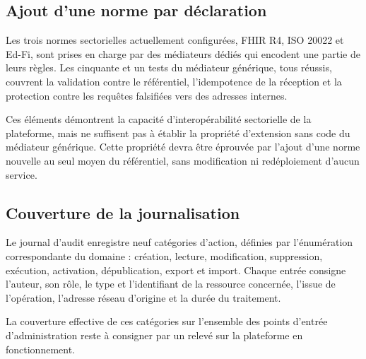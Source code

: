 
\subsection{Ajout d'une norme par déclaration}

Les trois normes sectorielles actuellement configurées, FHIR R4, ISO 20022 et
Ed-Fi, sont prises en charge par des médiateurs dédiés qui encodent une partie de
leurs règles. Les cinquante et un tests du médiateur générique, tous réussis,
couvrent la validation contre le référentiel, l'idempotence de la réception et la
protection contre les requêtes falsifiées vers des adresses internes.

Ces éléments démontrent la capacité d'interopérabilité sectorielle de la
plateforme, mais ne suffisent pas à établir la propriété d'extension sans code du
médiateur générique. Cette propriété devra être éprouvée par l'ajout d'une norme
nouvelle au seul moyen du référentiel, sans modification ni redéploiement d'aucun
service.



\subsection{Couverture de la journalisation}

Le journal d'audit enregistre neuf catégories d'action, définies par
l'énumération correspondante du domaine : création, lecture, modification,
suppression, exécution, activation, dépublication, export et import. Chaque entrée
consigne l'auteur, son rôle, le type et l'identifiant de la ressource concernée,
l'issue de l'opération, l'adresse réseau d'origine et la durée du traitement.

La couverture effective de ces catégories sur l'ensemble des points d'entrée
d'administration reste à consigner par un relevé sur la plateforme en
fonctionnement.



